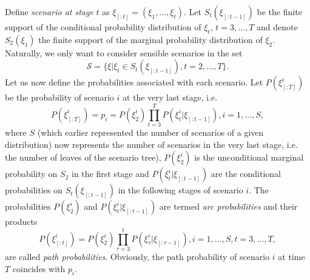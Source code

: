 Define \textit{scenario at stage} $t$ as $\xi_{[:t]} = (\xi_1,\dots,\xi_t)$.
Let $S_t(\xi_{[:t-1]})$ be the finite support of the conditional probability distribution of $\xi_t, \, t=3,\dots,T$ and denote $S_2(\xi_{1})$ the finite support of the marginal probability distribution of $\xi_2$. Naturally, we only want to consider sensible scenarios in the set 
\begin{equation*}
\mathcal{S}=\{\xi|\xi_t \in S_t(\xi_{[:t-1]}), t=2,\dots,T\}.
\end{equation*} 
Let us now define the probabilities associated with each scenario. Let $P(\xi_{[:T]}^i)$ be the probability of scenario $i$ at the very last stage, i.e.
\begin{equation}
\label{eq:scenario_probabilities}
P(\xi_{[:T]}^i)=p_i=P(\xi_2^i)\prod_{t=3}^{T}P(\xi_t^i|\xi_{[:t-1]}), i=1,\dots,S,
\end{equation}
where $S$ (which earlier represented the number of scenarios of a given distribution) now represents the number of scenarios in the very last stage, i.e. the number of leaves of the scenario tree), $P(\xi_2^i)$ is the unconditional marginal probability on $S_2$ in the first stage and $P(\xi_t^i|\xi_{[:t-1]})$ are the conditional probabilities on $S_t(\xi_{[:t-1]})$ in the following stages of scenario $i$. The probabilities $P(\xi_2^i)$ and $P(\xi_t^i|\xi_{[:t-1]})$ are termed \textit{arc probabilities} and their products
\begin{equation}
P(\xi_{[:t]}^i)=P(\xi_2^i)\prod_{\tau=3}^{t}P(\xi_\tau^i|\xi_{[:\tau-1]}), i=1,\dots,S, t=3,\dots,T,
\end{equation}
are called \textit{path probabilities}. Obviously, the path probability of scenario $i$ at time $T$ coincides with $p_i$.

